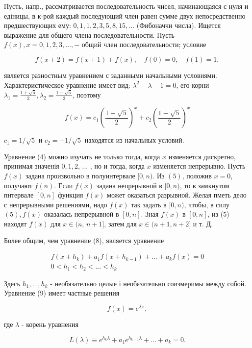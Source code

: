 \documentclass[10pt]{article}
\begin{document}
Пусть, напр., рассматривается последовательность чисел, начинающаяся с нуля и едіницы, в к-рой каждый последующий член равен сумме двух непосредственно предшествующих ему: $0,1,1,2,3,5,8,15, \ldots$ (Фибоначчи числа). Ищется выражение для общего члена последовательности. Пусть $f(x), x=0,1,2,3, \ldots,-$ общий член последовательности; условие



\[

f(x+2)=f(x+1)+f(x), \quad f(0)=0, \quad f(1)=1,

\]



является разностным уравнением с заданными начальными условиями. Характеристическое уравнение имеет вид: $\lambda^{2}-\lambda-1=0$, его корни $\lambda_{1}=\frac{1+\sqrt{5}}{2}, \lambda_{2}=\frac{1-\sqrt{5}}{2}$, поэтому



\[

f(x)=c_{1}\left(\frac{1+\sqrt{5}}{2}\right)^{x}+c_{2}\left(\frac{1-\sqrt{5}}{2}\right)^{x}

\]



$c_{1}=1 / \sqrt{5}$ и $c_{2}=-1 / \sqrt{5}$ находятся из начальных условий.



Уравнение (4) можно изучать не только тогда, когда $x$ изменяется дискретно, принимая значенія $0,1,2$, ... , но и тогда, когда $x$ изменяется непрерывно. Пусть $f(x)$ задана произвольно в полуинтервале $[0, n)$. Из $(5)$, положив $x=0$, получают $f(n)$. Если $f(x)$ задана непрерывной в $[0, n)$, то в замкнутом пнтервале $[0, n]$ функция $f(x)$ может оказаться разрывной. Желая пметь дело с непрерывными решениями, надо $f(x)$ так задать в $[0, n)$, чтобы, в силу $(5), f(x)$ оказалась непрерывной в $[0, n]$. Зная $f(x)$ в $[0, n]$, из (5) находят $f(x)$ для $x \in(n$, $n+1]$, затем для $x \in(n+1, n+2]$ и т. Д.



Более общим, чем уравнение (8), является уравнение



\[

\begin{gathered}

f\left(x+h_{k}\right)+a_{1} f\left(x+h_{k-1}\right)+\ldots+a_{k} f(x)=0 \\

0<h_{1}<h_{2}<\ldots<h_{k}

\end{gathered}

\]



Здесь $h_{1}, \ldots, h_{k}$ - необязательно целые і необязательно соизмеримы между собой. Уравнение (9) имеет частные решения



\[

f(x)=e^{\lambda x},

\]



где $\lambda$ - корень уравнения



\[

L(\lambda) \equiv e^{h_{k} \lambda}+a_{1} e^{h_{k-1} \lambda}+\ldots+a_{k}=0 .

\]
\end{document}
